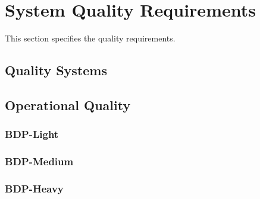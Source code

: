 \KNEADSECTIONNEWPAGE
\section{System Quality Requirements}
\label{lab:sec_Quality}



This section specifies the \ThisSys quality requirements.

\subsection{Quality Systems}
\label{lab:ssec_QualitySystems}



\subsection{Operational Quality}
\label{lab:ssec_OperationalQuality}

\subsubsection{BDP-Light}
\label{loc:sssec_OperationQualityLight}


\subsubsection{BDP-Medium}
\label{loc:sssec_OperationQualityMedium}


\subsubsection{BDP-Heavy}
\label{loc:sssec_OperationQualityHeavy}




